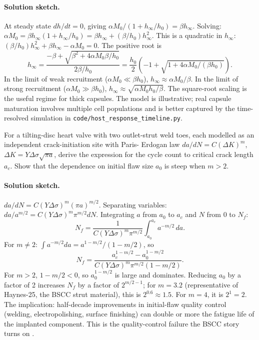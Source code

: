 \paragraph{Solution sketch.}
At steady state $dh/dt = 0$, giving $\alpha M_0 / (1 + h_\infty/h_0)
= \beta h_\infty$. Solving: $\alpha M_0 = \beta h_\infty
(1 + h_\infty/h_0) = \beta h_\infty + (\beta/h_0) h_\infty^2$. This
is a quadratic in $h_\infty$: $(\beta/h_0) h_\infty^2 + \beta
h_\infty - \alpha M_0 = 0$. The positive root is
\[
h_\infty = \frac{-\beta + \sqrt{\beta^2 + 4 \alpha M_0 \beta / h_0}}
{2 \beta / h_0}
= \frac{h_0}{2}\left(-1 + \sqrt{1 + 4 \alpha M_0 / (\beta h_0)}\right).
\]
In the limit of weak recruitment ($\alpha M_0 \ll \beta h_0$),
$h_\infty \approx \alpha M_0 / \beta$. In the limit of strong
recruitment ($\alpha M_0 \gg \beta h_0$), $h_\infty \approx
\sqrt{\alpha M_0 h_0 / \beta}$. The square-root scaling is the
useful regime for thick capsules. The model is illustrative;
real capsule maturation involves multiple cell populations and is
better captured by the time-resolved simulation in
\texttt{code/host\_response\_timeline.py}.

\begin{exercise}
For a tilting-disc heart valve with two outlet-strut weld toes,
each modelled as an independent crack-initiation site with Paris-
Erdogan law $da/dN = C (\Delta K)^m$, $\Delta K = Y \Delta \sigma
\sqrt{\pi a}$, derive the expression for the cycle count to
critical crack length $a_c$. Show that the dependence on initial
flaw size $a_0$ is steep when $m > 2$.
\end{exercise}

\paragraph{Solution sketch.}
$da/dN = C (Y \Delta \sigma)^m (\pi a)^{m/2}$. Separating
variables: $da / a^{m/2} = C (Y \Delta \sigma)^m \pi^{m/2} dN$.
Integrating $a$ from $a_0$ to $a_c$ and $N$ from 0 to $N_f$:
\[
N_f = \frac{1}{C (Y \Delta \sigma)^m \pi^{m/2}}
\int_{a_0}^{a_c} a^{-m/2} \, da.
\]
For $m \ne 2$: $\int a^{-m/2} da = a^{1 - m/2} / (1 - m/2)$, so
\[
N_f = \frac{a_c^{1 - m/2} - a_0^{1 - m/2}}
{C (Y \Delta \sigma)^m \pi^{m/2} (1 - m/2)}.
\]
For $m > 2$, $1 - m/2 < 0$, so $a_0^{1 - m/2}$ is large and
dominates. Reducing $a_0$ by a factor of 2 increases $N_f$ by a
factor of $2^{m/2 - 1}$; for $m = 3.2$ (representative of
Haynes-25, the BSCC strut material), this is $2^{0.6} \approx 1.5$.
For $m = 4$, it is $2^1 = 2$. The implication: half-decade
improvements in initial-flaw quality control (welding,
electropolishing, surface finishing) can double or more the
fatigue life of the implanted component. This is the
quality-control failure the BSCC story turns on
\cite{paper:v6c12-paris-erdogan-1963,
paper:v6c12-vanderlugt-strut-fracture-1993,
web:v6c12-doj-shiley-1994-settlement}.

